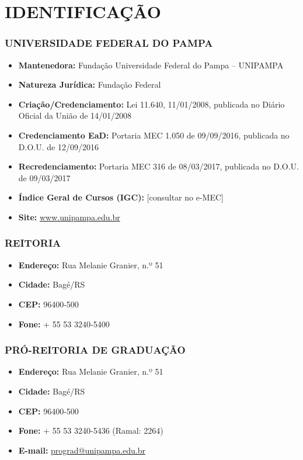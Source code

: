 
\chapter*{IDENTIFICAÇÃO}

\subsection*{UNIVERSIDADE FEDERAL DO PAMPA}

\begin{itemize}
    \item \textbf{Mantenedora:} Fundação Universidade Federal do Pampa – UNIPAMPA
    \item \textbf{Natureza Jurídica:} Fundação Federal
    \item \textbf{Criação/Credenciamento:} Lei 11.640, 11/01/2008, publicada no Diário Oficial da União de 14/01/2008
    \item \textbf{Credenciamento EaD:} Portaria MEC 1.050 de 09/09/2016, publicada no D.O.U. de 12/09/2016 
    \item \textbf{Recredenciamento:} Portaria MEC 316 de 08/03/2017, publicada no D.O.U. de 09/03/2017
    \item \textbf{Índice Geral de Cursos (IGC):} [consultar no e-MEC]
    \item \textbf{Site:} \url{www.unipampa.edu.br}
\end{itemize}

\subsection*{REITORIA}

\begin{itemize}
    \item \textbf{Endereço:} Rua Melanie Granier, n.º 51
    \item \textbf{Cidade:} Bagé/RS
    \item \textbf{CEP:} 96400-500
    \item \textbf{Fone:} + 55 53 3240-5400
\end{itemize}

\subsection*{PRÓ-REITORIA DE GRADUAÇÃO}

\begin{itemize}
    \item \textbf{Endereço:} Rua Melanie Granier, n.º 51 
    \item \textbf{Cidade:} Bagé/RS
    \item \textbf{CEP:} 96400-500
    \item \textbf{Fone:} + 55 53 3240-5436 (Ramal: 2264)
    \item \textbf{E-mail:} \href{mailto:prograd@unipampa.edu.br}{prograd@unipampa.edu.br}
\end{itemize}

